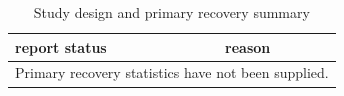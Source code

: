 \begin{table}[htbp]
\centering
\caption{Study design and primary recovery summary}
\label{tab:study-recovery}
\begin{tabular}{ll}
\hline
report status & reason \\
\hline
\multicolumn{2}{l}{Primary recovery statistics have not been supplied.} \\
\hline
\end{tabular}
\end{table}
